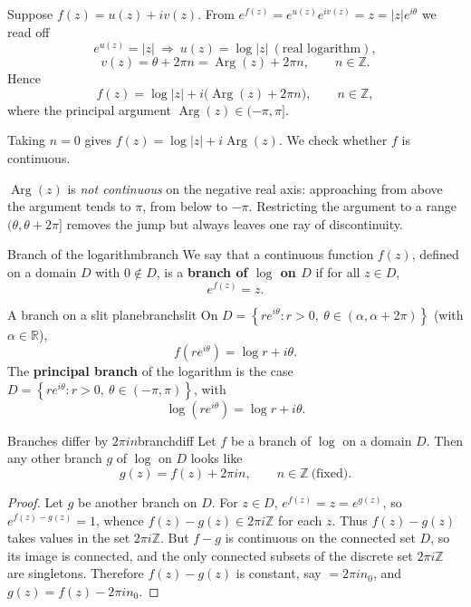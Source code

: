 \documentclass[11pt,openany]{report}
\newcommand{\R}{\mathbb{R}}
\newcommand{\Z}{\mathbb{Z}}
\newcommand{\Arg}{\operatorname{Arg}}
\newcommand{\abs}[1]{\left\lvert #1 \right\rvert}
\newcommand{\set}[1]{\left\{ #1 \right\}}
\begin{document}
Suppose $f(z)=u(z)+iv(z)$. From $e^{f(z)}=e^{u(z)}e^{iv(z)}=z=\abs{z}e^{i\theta}$ we read
off
\[
  e^{u(z)} = \abs{z} \ \Longrightarrow\ u(z)=\log\abs{z} \ (\text{real logarithm}),
\]
\[
  v(z) = \theta + 2\pi n = \Arg(z) + 2\pi n, \qquad n\in\Z .
\]
Hence
\[
  f(z) = \log\abs{z} + i\bigl(\Arg(z)+2\pi n\bigr), \qquad n\in\Z,
\]
where the principal argument $\Arg(z)\in(-\pi,\pi]$.

Taking $n=0$ gives $f(z)=\log\abs{z}+i\Arg(z)$. We check whether $f$ is continuous.

\begin{caution}
$\Arg(z)$ is \emph{not continuous} on the negative real axis: approaching from above the
argument tends to $\pi$, from below to $-\pi$. Restricting the argument to a range
$(\theta,\theta+2\pi]$ removes the jump but always leaves one ray of discontinuity.
\end{caution}

\begin{definition}{Branch of the logarithm}{branch}
We say that a continuous function $f(z)$, defined on a domain $D$ with $0\notin D$, is a
\textbf{branch of $\log$ on $D$} if for all $z\in D$,
\[
  e^{f(z)} = z .
\]
\end{definition}

\begin{example}{A branch on a slit plane}{branchslit}
On $D=\set{ r e^{i\theta} : r>0,\ \theta\in(\alpha,\alpha+2\pi) }$ (with $\alpha\in\R$),
\[
  f(r e^{i\theta}) = \log r + i\theta.
\]
The \textbf{principal branch} of the logarithm is the case
$D=\set{ r e^{i\theta} : r>0,\ \theta\in(-\pi,\pi) }$, with
\[
  \log(r e^{i\theta}) = \log r + i\theta .
\]
\end{example}

\begin{propos}{Branches differ by $2\pi i n$}{branchdiff}
Let $f$ be a branch of $\log$ on a domain $D$. Then any other branch $g$ of $\log$ on $D$
looks like
\[
  g(z) = f(z) + 2\pi i n, \qquad n\in\Z\ \text{(fixed)}.
\]
\end{propos}

\begin{proof}
Let $g$ be another branch on $D$. For $z\in D$, $e^{f(z)}=z=e^{g(z)}$, so
$e^{f(z)-g(z)}=1$, whence $f(z)-g(z)\in 2\pi i\Z$ for each $z$. Thus $f(z)-g(z)$ takes
values in the set $2\pi i\Z$. But $f-g$ is continuous on the connected set $D$, so its
image is connected, and the only connected subsets of the discrete set $2\pi i\Z$ are
singletons. Therefore $f(z)-g(z)$ is constant, say $=2\pi i n_0$, and
$g(z)=f(z)-2\pi i n_0$.
\end{proof}
\end{document}
